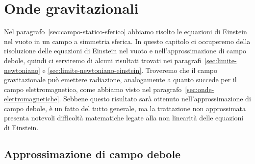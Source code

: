 \chapter{Onde gravitazionali}
\label{cha:onde-grav}

Nel paragrafo~\ref{sec:campo-statico-sferico} abbiamo risolto le equazioni di
Einstein nel vuoto in un campo a simmetria sferica.  In questo capitolo ci
occuperemo della risoluzione delle equazioni di Einstein nel vuoto e
nell'approssimazione di campo debole, quindi ci serviremo di alcuni risultati
trovati nei paragrafi~\ref{sec:limite-newtoniano} e
\ref{sec:limite-newtoniano-einstein}.  Troveremo che il campo gravitazionale può
emettere radiazione, analogamente a quanto succede per il campo
elettromagnetico, come abbiamo visto nel
paragrafo~\ref{sec:onde-elettromagnetiche}.  Sebbene questo risultato sarà
ottenuto nell'approssimazione di campo debole, è un fatto del tutto generale, ma
la trattazione non approssimata presenta notevoli difficoltà matematiche legate
alla non linearità delle equazioni di Einstein.

\section{Approssimazione di campo debole}
\label{sec:approx-campo-debole-onde}

